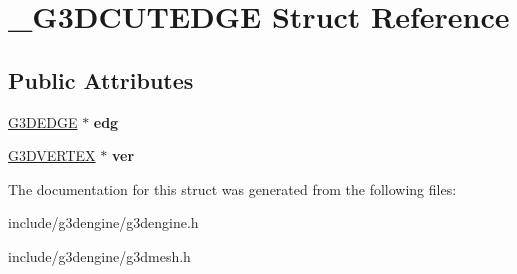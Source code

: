 \hypertarget{struct__G3DCUTEDGE}{}\section{\+\_\+\+G3\+D\+C\+U\+T\+E\+D\+GE Struct Reference}
\label{struct__G3DCUTEDGE}
\subsection*{Public Attributes}
\begin{DoxyCompactItemize}
\item 
\mbox{\label{struct__G3DCUTEDGE_afa167c39801400a760d5689ea11295be}} 
\hyperlink{struct__G3DEDGE}{G3\+D\+E\+D\+GE} $\ast$ {\bfseries edg}
\item 
\mbox{\label{struct__G3DCUTEDGE_abca98f9c1a2eab57803228c0b6fa4193}} 
\hyperlink{struct__G3DVERTEX}{G3\+D\+V\+E\+R\+T\+EX} $\ast$ {\bfseries ver}
\end{DoxyCompactItemize}


The documentation for this struct was generated from the following files\+:\begin{DoxyCompactItemize}
\item 
include/g3dengine/g3dengine.\+h\item 
include/g3dengine/g3dmesh.\+h\end{DoxyCompactItemize}
